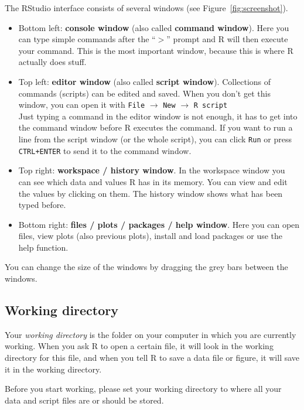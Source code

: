 \documentclass[a4paper,11pt,twocolumn,tablecaptionabove]{scrartcl}
\begin{document}
The RStudio interface consists of several windows (see Figure~\ref{fig:screenshot}). 
\begin{itemize}
\item Bottom left: \textbf{console window} (also called \textbf{command window}). Here you can type simple commands after the ``$>$'' prompt and R will then execute your command. This is the most important window, because this is where R actually does stuff. 
\item Top left: \textbf{editor window} (also called \textbf{script window}). Collections of commands (scripts) can be edited and saved. When you don't get this window, you can open it with \texttt{File} $\rightarrow$ \texttt{New} $\rightarrow$ \texttt{R script}\\
Just typing a command in the editor window is not enough, it has to get into the command window before R executes the command. If you want to run a line from the script window (or the whole script), you can click \texttt{Run} or press \texttt{CTRL+ENTER} to send it to the command window. 
\item Top right: \textbf{workspace / history window}. In the workspace window you can see which data and values R has in its memory. You can view and edit the values by clicking on them.
The history window shows what has been typed before. 
\item Bottom right: \textbf{files / plots / packages / help window}. Here you can open files, view plots (also previous plots), install and load packages or use the help function.
\end{itemize}

You can change the size of the windows by dragging the grey bars between the windows.

\subsection{Working directory}

Your \emph{working directory} is the folder on your computer in which you are currently working. When you ask R to open a certain file, it will look in the working directory for this file, and when you tell R to save a data file or figure, it will save it in the working directory.

Before you start working, please set your working directory to where all your data and script files are or should be stored.
\end{document}
